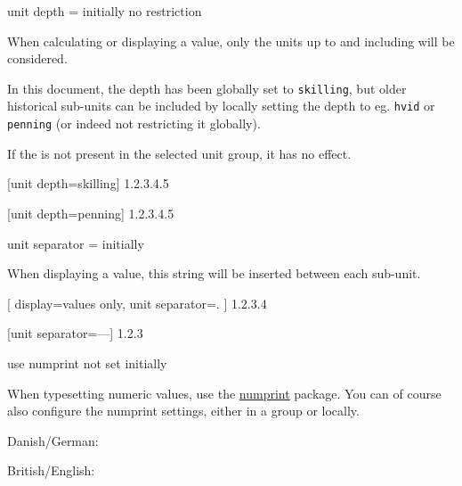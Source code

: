 \documentclass[
	a4paper,
]{article}
\begin{document}
\begin{docKey}
	{unit depth}
	{=}
	{initially no restriction}
	
	When calculating or displaying a value, only the units up to and including  will be considered.
	
	In this document, the depth has been globally set to \texttt{skilling}, but older historical sub-units can be included by locally setting the depth to eg. \texttt{hvid} or \texttt{penning} (or indeed not restricting it globally).
	
	If the  is not present in the selected unit group, it has no effect.
	
\begin{dispExample}
	[unit depth=skilling]
	{1.2.3.4.5}

	[unit depth=penning]
	{1.2.3.4.5}
\end{dispExample}
\end{docKey}

\begin{docKey}
	{unit separator}
	{=}
	{initially }
	
	When displaying a value, this string will be inserted between each sub-unit.

\begin{dispExample}
[
		display=values only,
		unit separator=.
	]
	{1.2.3.4}

	[unit separator={---}]
	{1.2.3}
\end{dispExample}

\end{docKey}

\begin{docKey}
	{use numprint}
	{}
	{not set initially}
	
	When typesetting numeric values, use the \href{https://ctan.org/pkg/numprint}{numprint} package. You can of course also configure the numprint settings, either in a group or locally.

\begin{dispExample}
\begingroup

	Danish/German:

	British/English:
\endgroup
\end{dispExample}

\end{docKey}
\end{document}
